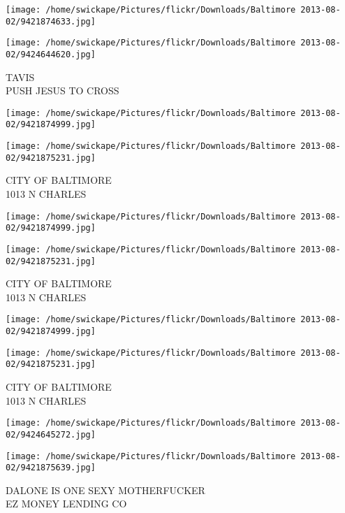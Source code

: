 \documentclass[10pt,letterpaper]{article}
\begin{document}
\texttt{[image: /home/swickape/Pictures/flickr/Downloads/Baltimore 2013-08-02/9421874633.jpg]}

\vspace{0.25in}
\texttt{[image: /home/swickape/Pictures/flickr/Downloads/Baltimore 2013-08-02/9424644620.jpg]}

TAVIS\\
PUSH JESUS TO CROSS\\
\pagebreak

\texttt{[image: /home/swickape/Pictures/flickr/Downloads/Baltimore 2013-08-02/9421874999.jpg]}

\vspace{0.25in}
\texttt{[image: /home/swickape/Pictures/flickr/Downloads/Baltimore 2013-08-02/9421875231.jpg]}

CITY OF BALTIMORE\\
1013 N CHARLES\\
\pagebreak

\texttt{[image: /home/swickape/Pictures/flickr/Downloads/Baltimore 2013-08-02/9421874999.jpg]}

\vspace{0.25in}
\texttt{[image: /home/swickape/Pictures/flickr/Downloads/Baltimore 2013-08-02/9421875231.jpg]}

CITY OF BALTIMORE\\
1013 N CHARLES\\
\pagebreak

\texttt{[image: /home/swickape/Pictures/flickr/Downloads/Baltimore 2013-08-02/9421874999.jpg]}

\vspace{0.25in}
\texttt{[image: /home/swickape/Pictures/flickr/Downloads/Baltimore 2013-08-02/9421875231.jpg]}

CITY OF BALTIMORE\\
1013 N CHARLES\\
\pagebreak

\texttt{[image: /home/swickape/Pictures/flickr/Downloads/Baltimore 2013-08-02/9424645272.jpg]}

\vspace{0.25in}
\texttt{[image: /home/swickape/Pictures/flickr/Downloads/Baltimore 2013-08-02/9421875639.jpg]}

DALONE IS ONE SEXY MOTHERFUCKER\\
EZ MONEY LENDING CO\\
\pagebreak
\end{document}
